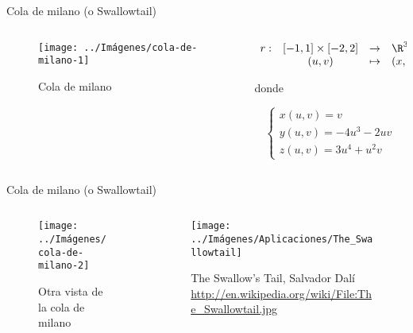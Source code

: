\documentclass[10pt]{beamer}
\begin{document}
	\begin{frame}{Cola de milano (o Swallowtail)}
		\begin{columns}[t] %
			\begin{column}{.50\textwidth}
				\begin{figure}
					\centering
					\texttt{[image: ../Imágenes/cola-de-milano-1]}
					\caption{Cola de milano}
					\label{fig:cola-de-milano-1}
				\end{figure}
			\end{column}%
			\hfill%
			\begin{column}{.50\textwidth}
				$$\begin{array}{rcll}
				r : & [-1, 1] \times [-2,2] & \to & \R^3\\
				& (u,v) & \mapsto & (x,y,z)
				\end{array}$$
				
				donde 
				
				$$ \begin{cases}
				x(u,v) = v \\
				y(u,v) = -4u^3 - 2uv \\
				z(u,v) = 3u^4 + u^2v
				\end{cases} $$
			\end{column}%
		\end{columns}
	\end{frame}
	
	\begin{frame}{Cola de milano (o Swallowtail)}
		\begin{columns}[b] %
			\begin{column}{.50\textwidth}
				\begin{figure}
					\centering
					\texttt{[image: ../Imágenes/cola-de-milano-2]}
					\caption{Otra vista de la cola de milano}
					\label{fig:cola-de-milano-2}
				\end{figure}
			\end{column}%
			\hfill%
			\begin{column}{.50\textwidth}
				\begin{figure}
					\centering
					\texttt{[image: ../Imágenes/Aplicaciones/The\_Swallowtail]}
					\caption{The Swallow's Tail, Salvador Dalí \url{http://en.wikipedia.org/wiki/File:The_Swallowtail.jpg}}
					\label{fig:cola-de-milano-3}
				\end{figure}
			\end{column}%
		\end{columns}
	\end{frame}
		
\end{document}
